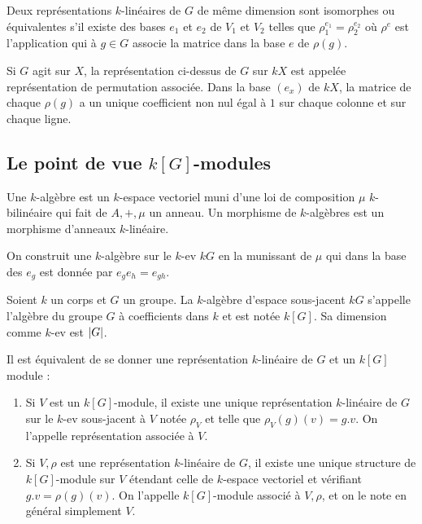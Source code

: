 \documentclass{cours}
\begin{document}
\begin{definition}
    Deux représentations $k$-linéaires de $G$ de même dimension sont isomorphes ou équivalentes s'il existe des bases $e_{1}$ et $e_{2}$ de $V_{1}$ et $V_{2}$ telles que $\rho_{1}^{e_{1}} = \rho_{2}^{e_{2}}$ où $\rho^{e}$ est l'application qui à $g \in G$ associe la matrice dans la base $e$ de $\rho(g)$.
\end{definition}

\begin{definition}
    Si $G$ agit sur $X$, la représentation ci-dessus de $G$ sur $kX$ est appelée représentation de permutation associée. Dans la base $(e_{x})$ de $kX$, la matrice de chaque $\rho(g)$ a un unique coefficient non nul égal à $1$ sur chaque colonne et sur chaque ligne.
\end{definition}

\subsection{Le point de vue $k[G]$-modules}
\begin{definition}
    Une $k$-algèbre est un $k$-espace vectoriel muni d'une loi de composition $\mu$ $k$-bilinéaire qui fait de $A, +, \mu$ un anneau. Un morphisme de $k$-algèbres est un morphisme d'anneaux $k$-linéaire.
\end{definition}

On construit une $k$-algèbre sur le $k$-ev $kG$ en la munissant de $\mu$ qui dans la base des $e_{g}$ est donnée par $e_{g}e_{h} = e_{gh}$.

\begin{definition}
    Soient $k$ un corps et $G$ un groupe. La $k$-algèbre d'espace sous-jacent $kG$ s'appelle l'algèbre du groupe $G$ à coefficients dans $k$ et est notée $k[G]$. Sa dimension comme $k$-ev est $\left|G\right|$.
\end{definition}

\begin{proposition}
    Il est équivalent de se donner une représentation $k$-linéaire de $G$ et un $k[G]$ module :
    \begin{enumerate}
        \item Si $V$ est un $k[G]$-module, il existe une unique représentation $k$-linéaire de $G$ sur le $k$-ev sous-jacent à $V$ notée $\rho_{V}$ et telle que $\rho_{V}(g)(v) = g.v$. On l'appelle représentation associée à $V$.
        \item Si $V, \rho$ est une représentation $k$-linéaire de $G$, il existe une unique structure de $k[G]$-module sur $V$ étendant celle de $k$-espace vectoriel et vérifiant $g.v = \rho(g)(v)$. On l'appelle $k[G]$-module associé à $V, \rho$, et on le note en général simplement $V$.
    \end{enumerate}
\end{proposition}
\end{document}
